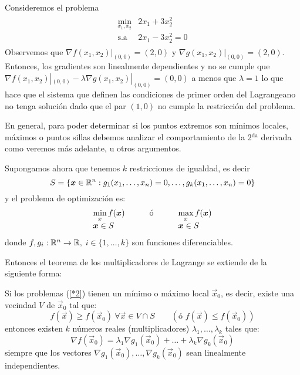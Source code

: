 \begin{ejemplo} Consideremos el problema
\begin{eqnarray*}
\begin{array}{cc}
\displaystyle \min_{x_1,x_2} & 2x_1+3x_2^2   \\
\text{s.a}  			 	 & 2x_1-3x_2^2=0
\end{array}
\end{eqnarray*}
Observemos que $\nabla f(x_1,x_2)|_{(0,0)}= (2,0)$ y $\nabla g(x_1,x_2)|_{(0,0)}=(2,0)$. Entonces, los gradientes son linealmente dependientes y no se cumple que $\nabla f(x_1,x_2)|_{(0,0)} - \lambda \nabla g(x_1,x_2)|_{(0,0)}=(0,0)$ a menos que $\lambda = 1$ lo que hace que el sistema que definen las condiciones de primer orden del Lagrangeano no tenga soluci\'on dado que el par $(1,0)$ no cumple la restricci\'on del problema.
\end{ejemplo}

En general, para poder determinar si los puntos extremos son m\'inimos
locales, m\'aximos o puntos sillas debemos analizar el comportamiento de la
2$^{\text{da}}$ derivada como veremos m\'as adelante, u otros argumentos.

Supongamos ahora que tenemos $k$ restricciones de igualdad, es decir
\[
S=\left\{\vec{x}\in\R^{n}: g_{1}(x_{1},\ldots,x_{n})=0,\ldots,g_{k}(x_{1}%
,\ldots,x_{n})=0\right\}
\]
y el problema de optimizaci\'on es:
\begin{equation}\label{*2}
\begin{array}
[c]{lll}
\displaystyle \min_x f(\vec{x}) & \qquad\text{\'o\qquad} & \displaystyle \max_x f(\vec{x})\\
\vec{x}\in S &  & \vec{x}\in S
\end{array}
\end{equation}
donde $f,g_i:\R^{n}\to\R,$ $i\in\{1,\ldots,k\}$ son funciones diferenciables.

Entonces el teorema de los multiplicadores de Lagrange se extiende de la siguiente forma:

\begin{teorema}
Si los problemas (\ref{*2}) tienen un m\'inimo o m\'aximo local $\vec{x}_{0}$,
es decir, existe una vecindad $V$ de $\vec{x}_{0}$ tal que:
\[
f(\vec{x})\geq f(\vec{x}_{0})\:\forall \vec{x}\in V\cap S\qquad\left(  \text{\'o }f(\vec{x})\leq
f(\vec{x}_{0})\right)
\]
entonces existen $k$ n\'umeros reales (multiplicadores) $\lambda
_{1},\ldots,\lambda_{k}$ tales que:
\[
\nabla f(\vec{x}_{0})=\lambda_{1}\nabla g_{1}(\vec{x}_{0})+\ldots+\lambda_{k}\nabla
g_{k}(\vec{x}_{0})
\]
siempre que los vectores $\nabla g_{1}(\vec{x}_{0}),\ldots,\nabla g_{k}(\vec{x}_{0})$ sean
linealmente independientes.
\end{teorema}

